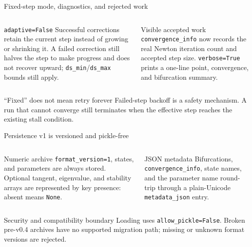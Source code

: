 \begin{frame}{Fixed-step mode, diagnostics, and rejected work}
\small
\begin{columns}[T,onlytextwidth]
\begin{block}{\texttt{adaptive=False}}
Successful corrections retain the current step instead of growing or
shrinking it. A failed correction still halves the step to make progress and
does not recover upward; \texttt{ds\_min}/\texttt{ds\_max} bounds still apply.
\end{block}
\begin{block}{Visible accepted work}
\texttt{convergence\_info} now records the real Newton iteration count and
accepted step size. \texttt{verbose=True} prints a one-line point,
convergence, and bifurcation summary.
\end{block}
\end{columns}
\vfill
\begin{alertblock}{``Fixed'' does not mean retry forever}
Failed-step backoff is a safety mechanism. A run that cannot converge still
terminates when the effective step reaches the existing stall condition.
\end{alertblock}
\end{frame}

\begin{frame}[fragile]{Persistence v1 is versioned and pickle-free}
\small
\begin{columns}[T,onlytextwidth]
\begin{block}{Numeric archive}
\lstinline|format_version=1|, states, and parameters are always stored.
Optional tangent, eigenvalue, and stability arrays are represented by key
presence: absent means \texttt{None}.
\end{block}
\begin{block}{JSON metadata}
Bifurcations, \texttt{convergence\_info}, state names, and the parameter name
round-trip through a plain-Unicode \texttt{metadata\_json} entry.
\end{block}
\end{columns}
\vfill
\begin{alertblock}{Security and compatibility boundary}
Loading uses \lstinline|allow_pickle=False|. Broken pre-v0.4 archives have no
supported migration path; missing or unknown format versions are rejected.
\end{alertblock}
\end{frame}

